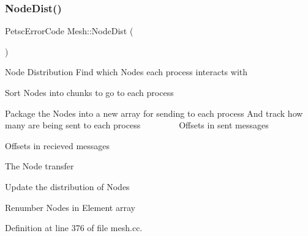 \subsubsection{\texorpdfstring{Node\+Dist()}{NodeDist()}}
{\footnotesize\ttfamily Petsc\+Error\+Code Mesh\+::\+Node\+Dist (\begin{DoxyParamCaption}{ }\end{DoxyParamCaption})\hspace{0.3cm}{\ttfamily [protected]}}

Node Distribution Find which Nodes each process interacts with

Sort Nodes into chunks to go to each process

Package the Nodes into a new array for sending to each process And track how many are being sent to each process ~\newline
~\newline
~\newline
~\newline
~\newline
 Offsets in sent messages

Offsets in recieved messages

The Node transfer

Update the distribution of Nodes

Renumber Nodes in Element array 

Definition at line 376 of file mesh.\+cc.


